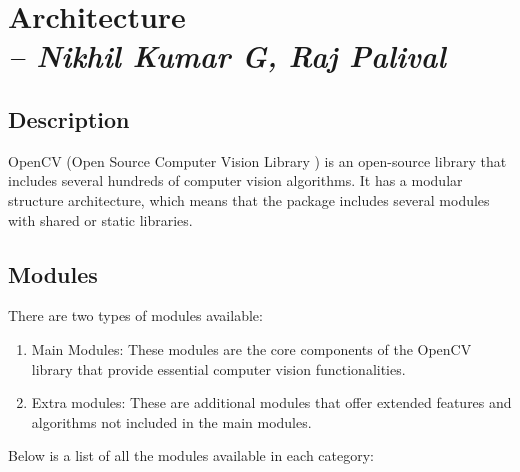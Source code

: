 \chapter{Architecture\\
\small{\textit{-- Nikhil Kumar G, Raj Palival}}
\label{Chapter::Architecture}}

\section{Description\label{Section::ArchitectureIntro}}
OpenCV (Open Source Computer Vision Library \cite{OCV}) is an open-source library that includes several hundreds of computer vision algorithms. It has a modular structure architecture, which means that the package includes several modules with shared or static libraries. 

\section{Modules \label{subSection::ModulesList}}
There are two types of modules available:
\begin{enumerate}
     \item Main Modules: These modules are the core components of the OpenCV library that provide essential computer vision functionalities.
     \item Extra modules: These are additional modules that offer extended features and algorithms not included in the main modules.
 \end{enumerate}
Below is a list of all the modules available in each category:


